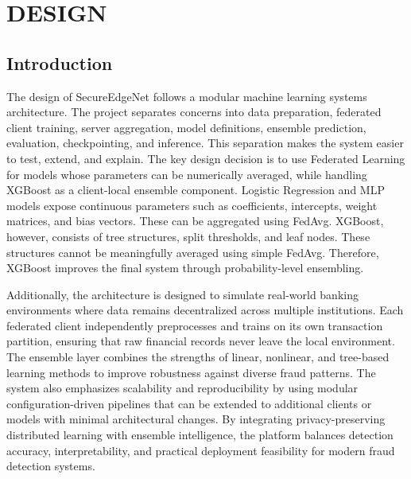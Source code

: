 \chapter{DESIGN}
\section{Introduction}
The design of SecureEdgeNet follows a modular machine learning systems architecture. The project separates concerns into data preparation, federated client training, server aggregation, model definitions, ensemble prediction, evaluation, checkpointing, and inference. This separation makes the system easier to test, extend, and explain. The key design decision is to use Federated Learning for models whose parameters can be numerically averaged, while handling XGBoost as a client-local ensemble component. Logistic Regression and MLP models expose continuous parameters such as coefficients, intercepts, weight matrices, and bias vectors. These can be aggregated using FedAvg. XGBoost, however, consists of tree structures, split thresholds, and leaf nodes. These structures cannot be meaningfully averaged using simple FedAvg. Therefore, XGBoost improves the final system through probability-level ensembling.

Additionally, the architecture is designed to simulate real-world banking environments where data remains decentralized across multiple institutions. Each federated client independently preprocesses and trains on its own transaction partition, ensuring that raw financial records never leave the local environment. The ensemble layer combines the strengths of linear, nonlinear, and tree-based learning methods to improve robustness against diverse fraud patterns. The system also emphasizes scalability and reproducibility by using modular configuration-driven pipelines that can be extended to additional clients or models with minimal architectural changes. By integrating privacy-preserving distributed learning with ensemble intelligence, the platform balances detection accuracy, interpretability, and practical deployment feasibility for modern fraud detection systems.

